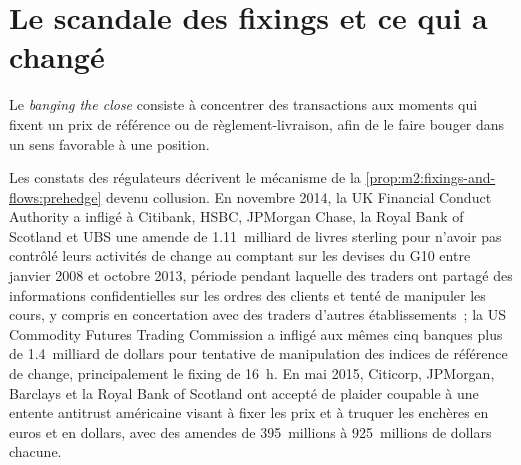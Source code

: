 \section{Le scandale des fixings et ce qui a changé}

\begin{definition}\label{def:m2:fixings-and-flows:banging}
Le \emph{banging the close} consiste à concentrer des transactions
aux moments qui fixent un prix de référence ou de règlement-livraison, afin de le faire
bouger dans un sens favorable à une position.
\end{definition}

Les constats des régulateurs décrivent le mécanisme de la
\cref{prop:m2:fixings-and-flows:prehedge} devenu collusion. En novembre
2014, la UK Financial Conduct Authority a infligé à Citibank, HSBC, JPMorgan Chase, la
Royal Bank of Scotland et UBS une amende de 1.11~milliard de livres sterling pour n'avoir pas contrôlé
leurs activités de change au comptant sur les devises du G10 entre janvier 2008 et octobre 2013, période
pendant laquelle des traders ont partagé des informations confidentielles sur les ordres des clients et tenté
de manipuler les cours, y compris en concertation avec des traders d'autres établissements~; la US
Commodity Futures Trading Commission a infligé aux mêmes cinq banques plus de 1.4~milliard de dollars
pour tentative de manipulation des indices de référence de change, principalement le fixing de 16~h. En
mai 2015, Citicorp, JPMorgan, Barclays et la Royal Bank of Scotland ont accepté de
plaider coupable à une entente antitrust américaine visant à fixer les prix et à truquer les enchères en euros et
en dollars, avec des amendes de 395~millions à 925~millions de dollars chacune.

